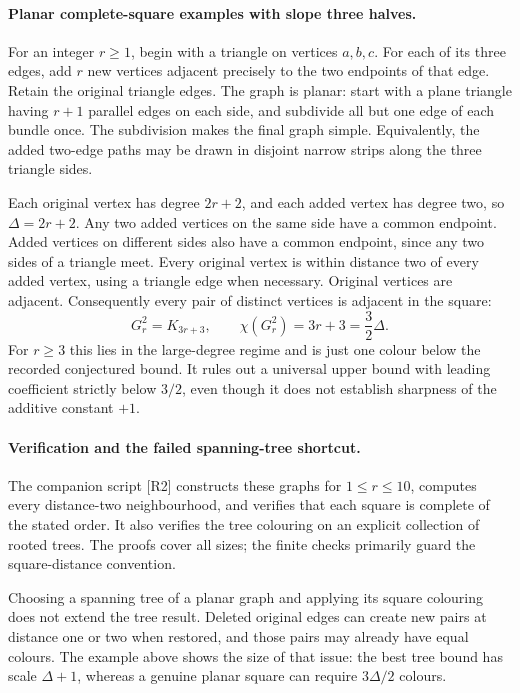 \documentclass[11pt,a4paper]{article}
\begin{document}
\paragraph{Planar complete-square examples with slope three halves.}
For an integer $r\ge1$, begin with a triangle on vertices $a,b,c$.
For each of its three edges, add $r$ new vertices adjacent precisely
to the two endpoints of that edge. Retain the original triangle edges.
The graph is planar: start with a plane triangle having $r+1$
parallel edges on each side, and subdivide all but one edge of each
bundle once. The subdivision makes the final graph simple. Equivalently,
the added two-edge paths may be drawn in disjoint narrow strips along
the three triangle sides.

Each original vertex has degree $2r+2$, and each added vertex has
degree two, so $\Delta=2r+2$. Any two added vertices on the same
side have a common endpoint. Added vertices on different sides also
have a common endpoint, since any two sides of a triangle meet.
Every original vertex is within distance two of every added vertex,
using a triangle edge when necessary. Original vertices are adjacent.
Consequently every pair of distinct vertices is adjacent in the square:
\[
 G_r^2=K_{3r+3},\qquad
 \chi(G_r^2)=3r+3=\frac32\Delta.
\]
For $r\ge3$ this lies in the large-degree regime and is just one
colour below the recorded conjectured bound. It rules out a universal
upper bound with leading coefficient strictly below $3/2$, even though
it does not establish sharpness of the additive constant $+1$.

\paragraph{Verification and the failed spanning-tree shortcut.}
The companion script [R2] constructs these graphs for $1\le r\le10$,
computes every distance-two neighbourhood, and verifies that each square
is complete of the stated order. It also verifies the tree colouring
on an explicit collection of rooted trees. The proofs cover all sizes;
the finite checks primarily guard the square-distance convention.

Choosing a spanning tree of a planar graph and applying its square
colouring does not extend the tree result. Deleted original edges
can create new pairs at distance one or two when restored, and those
pairs may already have equal colours. The example above shows the
size of that issue: the best tree bound has scale $\Delta+1$,
whereas a genuine planar square can require $3\Delta/2$ colours.
\end{document}
